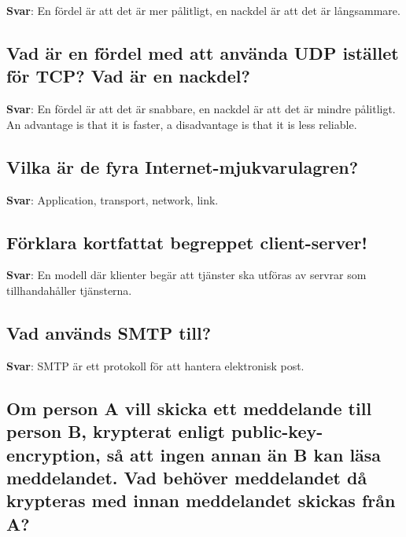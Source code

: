 \documentclass[a4paper,11pt,oneside]{article}
\begin{document}
\begin{sloppypar}
\label{q:163:sa:sv:True}

\textbf{Svar}: En f\"ordel \"ar att det \"ar mer p\r{a}litligt, en nackdel \"ar att det \"ar l\r{a}ngsammare.



\subsection{Vad \"ar en f\"ordel med att anv\"anda UDP ist\"allet f\"or TCP? Vad \"ar en nackdel?}

\label{q:164:sa:sv:True}

\textbf{Svar}: En f\"ordel \"ar att det \"ar snabbare, en nackdel \"ar att det \"ar mindre p\r{a}litligt. An advantage is that it is faster, a disadvantage is that it is less reliable.



\subsection{Vilka \"ar de fyra Internet-mjukvarulagren?}

\label{q:165:sa:sv:True}

\textbf{Svar}: Application, transport, network, link.



\subsection{F\"orklara kortfattat begreppet client-server!}

\label{q:166:sa:sv:True}

\textbf{Svar}: En modell d\"ar klienter beg\"ar att tj\"anster ska utf\"oras av servrar som tillhandah\r{a}ller tj\"ansterna.



\subsection{Vad anv\"ands SMTP till?}

\label{q:167:sa:sv:True}

\textbf{Svar}: SMTP \"ar ett protokoll f\"or att hantera elektronisk post.



\subsection{Om person A vill skicka ett meddelande till person B, krypterat enligt public-key-encryption, s\r{a} att ingen annan \"an B kan l\"asa meddelandet. Vad beh\"over meddelandet d\r{a} krypteras med innan meddelandet skickas fr\r{a}n A?}


\end{sloppypar}
\end{document}
